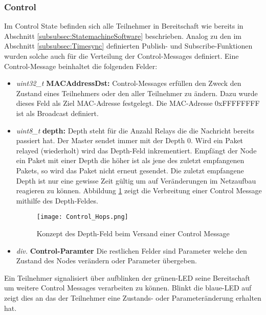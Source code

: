 
\subsubsection{Control}\label{subsubsec:Control}
Im Control State befinden sich alle Teilnehmer in Bereitschaft wie bereits in Abschnitt \ref{subsubsec:StatemachineSoftware} beschrieben.
Analog zu den im Abschnitt \ref{subsubsec:Timesync} definierten Publish- und Subscribe-Funktionen wurden solche auch für die Verteilung der Control-Messages definiert.
Eine Control-Message beinhaltet die folgenden Felder:

\begin{itemize}
	\item \textit{uint32\_t} \textbf{MACAddressDst:} Control-Messages erfüllen den Zweck den Zustand eines Teilnehmers oder den aller Teilnehmer zu ändern.
Dazu wurde dieses Feld als Ziel MAC-Adresse festgelegt. Die MAC-Adresse 0xFFFFFFFF ist als Broadcast definiert.
	
	\item \textit{uint8\_t} \textbf{depth:} Depth steht für die Anzahl Relays die die Nachricht bereits passiert hat.
	Der Master sendet immer mit der Depth 0.
	Wird ein Paket relayed (wiederholt) wird das Depth-Feld inkrementiert.
	Empfängt der Node ein Paket mit einer Depth die höher ist als jene des zuletzt empfangenen Pakets, so wird das Paket nicht erneut gesendet.
	Die zuletzt empfangene Depth ist nur eine gewisse Zeit gültig um auf Veränderungen im Netzaufbau reagieren zu können.
	Abbildung \ref{fig:ControlMessagesHops} zeigt die Verbreitung einer Control Message mithilfe des Depth-Feldes.
	
	
\begin{figure}[H]
\centering
\texttt{[image: Control\_Hops.png]}
\caption{Konzept des Depth-Feld beim Versand einer Control Message}\label{fig:ControlMessagesHops}
\end{figure}

	
	\item \textit{div.} \textbf{Control-Paramter} Die restlichen Felder sind Parameter welche den Zustand des Nodes verändern oder Parameter übergeben. 
\end{itemize}


Ein Teilnehmer signalisiert über aufblinken der grünen-LED seine Bereitschaft um weitere Control Messages verarbeiten zu können. Blinkt die blaue-LED auf zeigt dies an das der Teilnehmer eine Zustands- oder Parameteränderung erhalten hat. 

